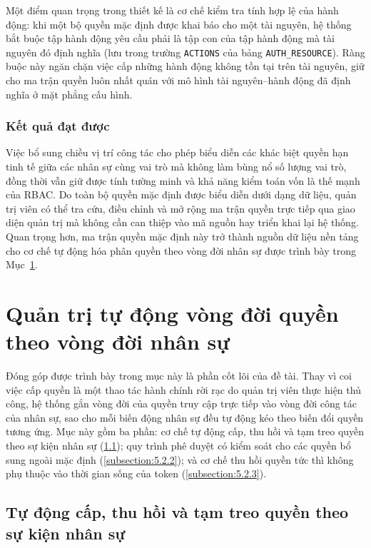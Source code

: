 \documentclass[../DoAn.tex]{subfiles}
\begin{document}
Một điểm quan trọng trong thiết kế là cơ chế kiểm tra tính hợp lệ của hành động: khi một bộ quyền mặc định được khai báo cho một tài nguyên, hệ thống bắt buộc tập hành động yêu cầu phải là tập con của tập hành động mà tài nguyên đó định nghĩa (lưu trong trường \texttt{ACTIONS} của bảng \texttt{AUTH\_RESOURCE}). Ràng buộc này ngăn chặn việc cấp những hành động không tồn tại trên tài nguyên, giữ cho ma trận quyền luôn nhất quán với mô hình tài nguyên--hành động đã định nghĩa ở mặt phẳng cấu hình.

\subsubsection*{Kết quả đạt được}

Việc bổ sung chiều vị trí công tác cho phép biểu diễn các khác biệt quyền hạn tinh tế giữa các nhân sự cùng vai trò mà không làm bùng nổ số lượng vai trò, đồng thời vẫn giữ được tính tường minh và khả năng kiểm toán vốn là thế mạnh của RBAC. Do toàn bộ quyền mặc định được biểu diễn dưới dạng dữ liệu, quản trị viên có thể tra cứu, điều chỉnh và mở rộng ma trận quyền trực tiếp qua giao diện quản trị mà không cần can thiệp vào mã nguồn hay triển khai lại hệ thống. Quan trọng hơn, ma trận quyền mặc định này trở thành nguồn dữ liệu nền tảng cho cơ chế tự động hóa phân quyền theo vòng đời nhân sự được trình bày trong Mục~\ref{section:5.2}.

\section{Quản trị tự động vòng đời quyền theo vòng đời nhân sự}
\label{section:5.2}

Đóng góp được trình bày trong mục này là phần cốt lõi của đề tài. Thay vì coi việc cấp quyền là một thao tác hành chính rời rạc do quản trị viên thực hiện thủ công, hệ thống gắn vòng đời của quyền truy cập trực tiếp vào vòng đời công tác của nhân sự, sao cho mỗi biến động nhân sự đều tự động kéo theo biến đổi quyền tương ứng. Mục này gồm ba phần: cơ chế tự động cấp, thu hồi và tạm treo quyền theo sự kiện nhân sự (\ref{subsection:5.2.1}); quy trình phê duyệt có kiểm soát cho các quyền bổ sung ngoài mặc định (\ref{subsection:5.2.2}); và cơ chế thu hồi quyền tức thì không phụ thuộc vào thời gian sống của token (\ref{subsection:5.2.3}).

\subsection{Tự động cấp, thu hồi và tạm treo quyền theo sự kiện nhân sự}
\label{subsection:5.2.1}
\end{document}
